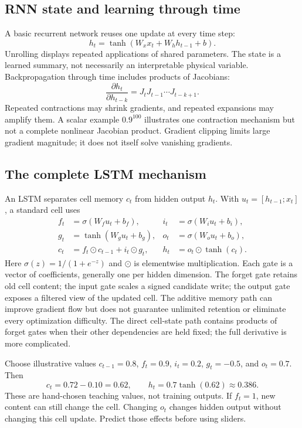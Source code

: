\subsection{RNN state and learning through time}
A basic recurrent network reuses one update at every time step:
\[h_t=\tanh(W_xx_t+W_hh_{t-1}+b).\]
Unrolling displays repeated applications of shared parameters. The state
is a learned summary, not necessarily an interpretable physical variable.
Backpropagation through time includes products of Jacobians:
\[\frac{\partial h_t}{\partial h_{t-k}}=J_tJ_{t-1}\cdots J_{t-k+1}.\]
Repeated contractions may shrink gradients, and repeated expansions may
amplify them. A scalar example $0.9^{100}$ illustrates one contraction
mechanism but not a complete nonlinear Jacobian product. Gradient clipping
limits large gradient magnitude; it does not itself solve vanishing gradients.

\subsection{The complete LSTM mechanism}
An LSTM separates cell memory $c_t$ from hidden output $h_t$. With
$u_t=[h_{t-1};x_t]$, a standard cell uses
\begin{align}
f_t&=\sigma(W_fu_t+b_f), & i_t&=\sigma(W_iu_t+b_i),\\
g_t&=\tanh(W_gu_t+b_g), & o_t&=\sigma(W_ou_t+b_o),\\
c_t&=f_t\odot c_{t-1}+i_t\odot g_t, &
h_t&=o_t\odot\tanh(c_t).
\end{align}
Here $\sigma(z)=1/(1+e^{-z})$ and $\odot$ is elementwise multiplication.
Each gate is a vector of coefficients, generally one per hidden dimension.
The forget gate retains old cell content; the input gate scales a signed
candidate write; the output gate exposes a filtered view of the updated cell.
The additive memory path can improve gradient flow but does not guarantee
unlimited retention or eliminate every optimization difficulty. The direct
cell-state path contains products of forget gates when their other
dependencies are held fixed; the full derivative is more complicated.

Choose illustrative values $c_{t-1}=0.8$, $f_t=0.9$, $i_t=0.2$,
$g_t=-0.5$, and $o_t=0.7$. Then
\[c_t=0.72-0.10=0.62,\qquad h_t=0.7\tanh(0.62)\approx0.386.\]
These are hand-chosen teaching values, not training outputs. If $f_t=1$,
new content can still change the cell. Changing $o_t$ changes hidden output
without changing this cell update. Predict those effects before using sliders.

